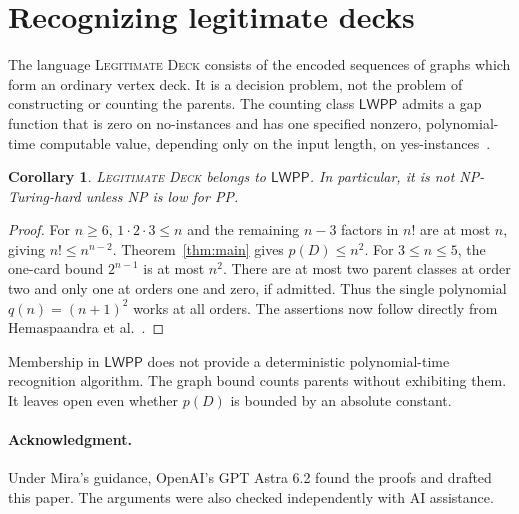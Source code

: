 \documentclass[11pt]{article}
\newtheorem{corollary}[theorem]{Corollary}
\theoremstyle{definition}\newtheorem{definition}[theorem]{Definition}\theoremstyle{plain}
\newcommand{\LWPP}{\mathsf{LWPP}}
\newcommand{\Leg}{\textnormal{\textsc{Legitimate Deck}}}
\begin{document}
\section{Recognizing legitimate decks}
The language \Leg{} consists of the encoded sequences of graphs which form an ordinary vertex deck. It is a decision problem, not the problem of constructing or counting the parents. The counting class $\LWPP$ admits a gap function that is zero on no-instances and has one specified nonzero, polynomial-time computable value, depending only on the input length, on yes-instances~\cite{hhsw}.

\begin{corollary}
\Leg{} belongs to $\LWPP$. In particular, it is not NP-Turing-hard unless NP is low for PP.
\end{corollary}
\begin{proof}
For $n\ge6$, $1\cdot2\cdot3\le n$ and the remaining $n-3$ factors in $n!$ are at most $n$, giving $n!\le n^{n-2}$. Theorem~\ref{thm:main} gives $p(D)\le n^2$. For $3\le n\le5$, the one-card bound $2^{n-1}$ is at most $n^2$. There are at most two parent classes at order two and only one at orders one and zero, if admitted. Thus the single polynomial $q(n)=(n+1)^2$ works at all orders. The assertions now follow directly from Hemaspaandra et al.~\cite[Cor.~4.9--4.10]{hhsw}.
\end{proof}

Membership in $\LWPP$ does not provide a deterministic polynomial-time recognition algorithm. The graph bound counts parents without exhibiting them. It leaves open even whether $p(D)$ is bounded by an absolute constant.




\paragraph{Acknowledgment.} Under Mira's guidance, OpenAI's GPT Astra 6.2 found the proofs and drafted this paper. The arguments were also checked independently with AI assistance.
\end{document}
